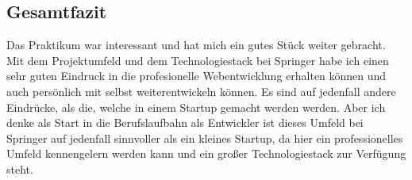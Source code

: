 \subsection{Gesamtfazit}
\label{sec:Fazit:BP:GFz}

Das Praktikum war interessant und hat mich ein gutes Stück weiter gebracht. Mit dem Projektumfeld und dem Technologiestack bei Springer habe ich einen sehr guten Eindruck in die profesionelle Webentwicklung erhalten können und auch persönlich mit selbst weiterentwickeln können. Es sind auf jedenfall andere Eindrücke, als die, welche in einem Startup gemacht werden werden. Aber ich denke als Start in die Berufslaufbahn als Entwickler ist dieses Umfeld bei Springer auf jedenfall sinnvoller als ein kleines Startup, da hier ein professionelles Umfeld kennengelern werden kann und ein großer Technologiestack zur Verfügung steht.